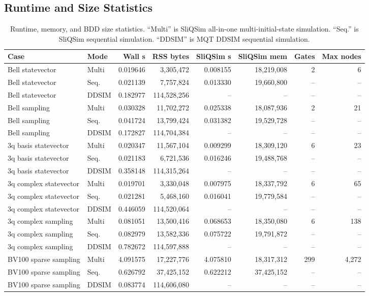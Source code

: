 \documentclass[sigconf,nonacm]{acmart}
\begin{document}
\subsection{Runtime and Size Statistics}
\begin{table}[t]
\centering
\caption{Runtime, memory, and BDD size statistics. ``Multi'' is SliQSim all-in-one multi-initial-state simulation. ``Seq.'' is SliQSim sequential simulation. ``DDSIM'' is MQT DDSIM sequential simulation.}
\label{tab:runtime}
\begin{tabular}{llrrrrrr}
\toprule
Case & Mode & Wall s & RSS bytes & SliQSim s & SliQSim mem & Gates & Max nodes \\
\midrule
Bell statevector & Multi & 0.019646 & 3,305,472 & 0.008155 & 18,219,008 & 2 & 6 \\
Bell statevector & Seq. & 0.021139 & 7,757,824 & 0.013330 & 19,660,800 & -- & -- \\
Bell statevector & DDSIM & 0.182977 & 114,528,256 & -- & -- & -- & -- \\
\midrule
Bell sampling & Multi & 0.030328 & 11,702,272 & 0.025338 & 18,087,936 & 2 & 21 \\
Bell sampling & Seq. & 0.041724 & 13,799,424 & 0.031382 & 19,529,728 & -- & -- \\
Bell sampling & DDSIM & 0.172827 & 114,704,384 & -- & -- & -- & -- \\
\midrule
3q basis statevector & Multi & 0.020347 & 11,567,104 & 0.009299 & 18,309,120 & 6 & 23 \\
3q basis statevector & Seq. & 0.021183 & 6,721,536 & 0.016246 & 19,488,768 & -- & -- \\
3q basis statevector & DDSIM & 0.358148 & 114,315,264 & -- & -- & -- & -- \\
\midrule
3q complex statevector & Multi & 0.019701 & 3,330,048 & 0.007975 & 18,337,792 & 6 & 65 \\
3q complex statevector & Seq. & 0.021281 & 5,468,160 & 0.016041 & 19,779,584 & -- & -- \\
3q complex statevector & DDSIM & 0.446059 & 114,520,064 & -- & -- & -- & -- \\
\midrule
3q complex sampling & Multi & 0.081051 & 13,500,416 & 0.068653 & 18,350,080 & 6 & 138 \\
3q complex sampling & Seq. & 0.082979 & 13,582,336 & 0.075722 & 19,791,872 & -- & -- \\
3q complex sampling & DDSIM & 0.782672 & 114,597,888 & -- & -- & -- & -- \\
\midrule
BV100 sparse sampling & Multi & 4.091575 & 17,227,776 & 4.075810 & 18,317,312 & 299 & 4,272 \\
BV100 sparse sampling & Seq. & 0.626792 & 37,425,152 & 0.622212 & 37,425,152 & -- & -- \\
BV100 sparse sampling & DDSIM & 0.083774 & 114,606,080 & -- & -- & -- & -- \\
\bottomrule
\end{tabular}
\end{table}
\end{document}
